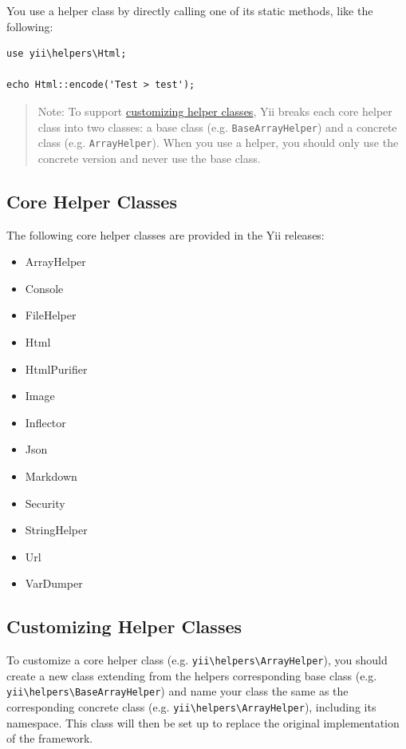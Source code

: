 You use a helper class by directly calling one of its static methods, like the following:

\lstset{language=php}\begin{lstlisting}
use yii\helpers\Html;

echo Html::encode('Test > test');
\end{lstlisting}
\begin{quote}Note: To support \hyperref[helper-overview.md::::customizing-helper-classes]{customizing helper classes}, Yii breaks each core helper class
  into two classes: a base class (e.g. \lstinline|BaseArrayHelper|) and a concrete class (e.g. \lstinline|ArrayHelper|).
  When you use a helper, you should only use the concrete version and never use the base class.

\end{quote}
\subsection{Core Helper Classes}
The following core helper classes are provided in the Yii releases:

\begin{itemize}
\item ArrayHelper
\item Console
\item FileHelper
\item Html
\item HtmlPurifier
\item Image
\item Inflector
\item Json
\item Markdown
\item Security
\item StringHelper
\item Url
\item VarDumper
\end{itemize}
\subsection{Customizing Helper Classes \label{helper-overview.md::customizing-helper-classes}}
To customize a core helper class (e.g. \texttt{yii{\allowbreak{}\textbackslash}helpers{\allowbreak{}\textbackslash}ArrayHelper}), you should create a new class extending
from the helpers corresponding base class (e.g. \texttt{yii{\allowbreak{}\textbackslash}helpers{\allowbreak{}\textbackslash}BaseArrayHelper}) and name your class the same
as the corresponding concrete class (e.g. \texttt{yii{\allowbreak{}\textbackslash}helpers{\allowbreak{}\textbackslash}ArrayHelper}), including its namespace. This class
will then be set up to replace the original implementation of the framework.


